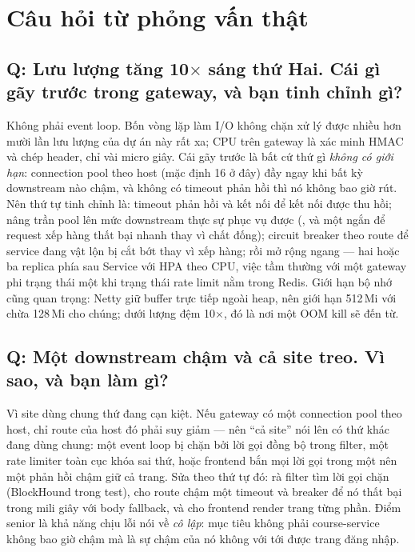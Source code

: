 \section{Câu hỏi từ phỏng vấn thật}

\subsection*{Q: Lưu lượng tăng 10$\times$ sáng thứ Hai. Cái gì gãy trước trong gateway, và bạn tinh chỉnh gì?}

Không phải event loop. Bốn vòng lặp làm I/O không chặn xử lý được
nhiều hơn mười lần lưu lượng của dự án này rất xa; CPU trên gateway là
xác minh HMAC và chép header, chỉ vài micro giây. Cái gãy trước là bất
cứ thứ gì \emph{không có giới hạn}: connection pool theo host (mặc định
16 ở đây) đầy ngay khi bất kỳ downstream nào chậm, và không có timeout
phản hồi thì nó không bao giờ rút. Nên thứ tự tinh chỉnh là: timeout
phản hồi và kết nối để kết nối được thu hồi; nâng trần pool lên mức
downstream thực sự phục vụ được (, và một
 ngắn để request xếp hàng thất bại nhanh thay vì
chất đống); circuit breaker theo route để service đang vật lộn bị cắt
bớt thay vì xếp hàng; rồi mở rộng ngang --- hai hoặc ba replica phía
sau Service với HPA theo CPU, việc tầm thường với một gateway phi trạng
thái một khi trạng thái rate limit nằm trong Redis. Giới hạn bộ nhớ
cũng quan trọng: Netty giữ buffer trực tiếp ngoài heap, nên giới hạn
512\,Mi với  chừa 128\,Mi cho chúng; dưới
lượng đệm 10$\times$, đó là nơi một OOM kill sẽ đến từ.

\subsection*{Q: Một downstream chậm và cả site treo. Vì sao, và bạn làm gì?}

Vì site dùng chung thứ đang cạn kiệt. Nếu gateway có một connection
pool theo host, chỉ route của host đó phải suy giảm --- nên ``cả site''
nói lên có thứ khác đang dùng chung: một event loop bị chặn bởi lời
gọi đồng bộ trong filter, một rate limiter toàn cục khóa sai thứ, hoặc
frontend bắn mọi lời gọi trong một  nên một phản hồi
chậm giữ cả trang. Sửa theo thứ tự đó: rà filter tìm lời gọi chặn
(BlockHound trong test), cho route chậm một timeout và breaker để nó
thất bại trong mili giây với body fallback, và cho frontend render
trang từng phần. Điểm senior là khả năng chịu lỗi nói về \emph{cô lập}:
mục tiêu không phải course-service không bao giờ chậm mà là sự chậm của
nó không với tới được trang đăng nhập.

